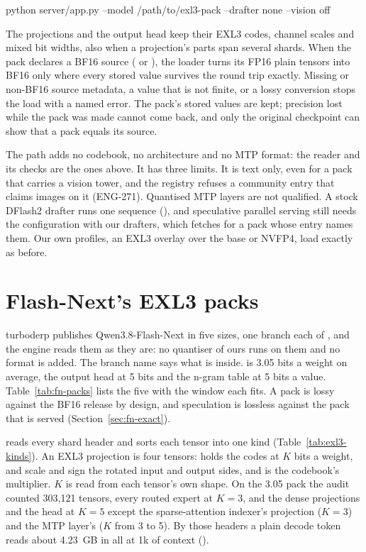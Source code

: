 \begin{shell}
python server/app.py --model /path/to/exl3-pack --drafter none --vision off
\end{shell}

The projections and the output head keep their EXL3 codes, channel scales and mixed bit widths, also when a projection's parts span several shards. When the pack declares a BF16 source ( or ), the loader turns its FP16 plain tensors into BF16 only where every stored value survives the round trip exactly. Missing or non-BF16 source metadata, a value that is not finite, or a lossy conversion stops the load with a named error. The pack's stored values are kept; precision lost while the pack was made cannot come back, and only the original checkpoint can show that a pack equals its source.

The path adds no codebook, no architecture and no MTP format: the  reader and its checks are the ones above. It has three limits. It is text only, even for a pack that carries a vision tower, and the registry refuses a community entry that claims images on it (ENG-271). Quantised MTP layers are not qualified. A stock DFlash2 drafter runs one sequence (), and speculative parallel serving still needs the  configuration with our drafters, which  fetches for a pack whose entry names them. Our own profiles, an EXL3 overlay over the base or NVFP4, load exactly as before.

\section{Flash-Next's EXL3 packs}\label{sec:exl3-packs}

turboderp publishes Qwen3.8-Flash-Next in five sizes, one branch each of , and the engine reads them as they are: no quantiser of ours runs on them and no format is added. The branch name says what is inside.  is 3.05 bits a weight on average, the output head at 5 bits and the n-gram table at 5 bits a value. Table~\ref{tab:fn-packs} lists the five with the window each fits. A pack is lossy against the BF16 release by design, and speculation is lossless against the pack that is served (Section~\ref{sec:fn-exact}).

 reads every shard header and sorts each tensor into one kind (Table~\ref{tab:exl3-kinds}). An EXL3 projection is four tensors:  holds the codes at $K$ bits a weight,  and  scale and sign the rotated input and output sides, and  is the codebook's multiplier. $K$ is read from each tensor's own shape. On the 3.05 pack the audit counted 303,121 tensors, every routed expert at $K=3$, and the dense projections and the head at $K=5$ except the sparse-attention indexer's projection ($K=3$) and the MTP layer's ($K$ from 3 to 5). By those headers a plain decode token reads about 4.23~GB in all at 1k of context (\arith).

